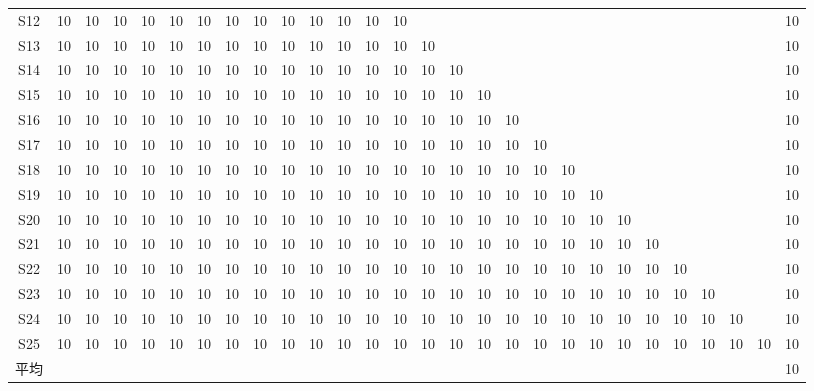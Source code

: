 \begin{landscape}
\begin{table}[t]
\begin{tabular}{c|ccccccccccccccccccccccccccc}
        S12 & 10 & 10 & 10 & 10 & 10 & 10 & 10 & 10 & 10 & 10 & 10 & 10 & 10 &    &    &    &    &    &    &    &    &    &    &    &    &    & 10 \\
        S13 & 10 & 10 & 10 & 10 & 10 & 10 & 10 & 10 & 10 & 10 & 10 & 10 & 10 & 10 &    &    &    &    &    &    &    &    &    &    &    &    & 10 \\
        S14 & 10 & 10 & 10 & 10 & 10 & 10 & 10 & 10 & 10 & 10 & 10 & 10 & 10 & 10 & 10 &    &    &    &    &    &    &    &    &    &    &    & 10 \\
        S15 & 10 & 10 & 10 & 10 & 10 & 10 & 10 & 10 & 10 & 10 & 10 & 10 & 10 & 10 & 10 & 10 &    &    &    &    &    &    &    &    &    &    & 10 \\
        S16 & 10 & 10 & 10 & 10 & 10 & 10 & 10 & 10 & 10 & 10 & 10 & 10 & 10 & 10 & 10 & 10 & 10 &    &    &    &    &    &    &    &    &    & 10 \\
        S17 & 10 & 10 & 10 & 10 & 10 & 10 & 10 & 10 & 10 & 10 & 10 & 10 & 10 & 10 & 10 & 10 & 10 & 10 &    &    &    &    &    &    &    &    & 10 \\
        S18 & 10 & 10 & 10 & 10 & 10 & 10 & 10 & 10 & 10 & 10 & 10 & 10 & 10 & 10 & 10 & 10 & 10 & 10 & 10 &    &    &    &    &    &    &    & 10 \\
        S19 & 10 & 10 & 10 & 10 & 10 & 10 & 10 & 10 & 10 & 10 & 10 & 10 & 10 & 10 & 10 & 10 & 10 & 10 & 10 & 10 &    &    &    &    &    &    & 10 \\
        S20 & 10 & 10 & 10 & 10 & 10 & 10 & 10 & 10 & 10 & 10 & 10 & 10 & 10 & 10 & 10 & 10 & 10 & 10 & 10 & 10 & 10 &    &    &    &    &    & 10 \\
        S21 & 10 & 10 & 10 & 10 & 10 & 10 & 10 & 10 & 10 & 10 & 10 & 10 & 10 & 10 & 10 & 10 & 10 & 10 & 10 & 10 & 10 & 10 &    &    &    &    & 10 \\
        S22 & 10 & 10 & 10 & 10 & 10 & 10 & 10 & 10 & 10 & 10 & 10 & 10 & 10 & 10 & 10 & 10 & 10 & 10 & 10 & 10 & 10 & 10 & 10 &    &    &    & 10 \\
        S23 & 10 & 10 & 10 & 10 & 10 & 10 & 10 & 10 & 10 & 10 & 10 & 10 & 10 & 10 & 10 & 10 & 10 & 10 & 10 & 10 & 10 & 10 & 10 & 10 &    &    & 10 \\
        S24 & 10 & 10 & 10 & 10 & 10 & 10 & 10 & 10 & 10 & 10 & 10 & 10 & 10 & 10 & 10 & 10 & 10 & 10 & 10 & 10 & 10 & 10 & 10 & 10 & 10 &    & 10 \\
        S25 & 10 & 10 & 10 & 10 & 10 & 10 & 10 & 10 & 10 & 10 & 10 & 10 & 10 & 10 & 10 & 10 & 10 & 10 & 10 & 10 & 10 & 10 & 10 & 10 & 10 & 10 & 10\\
        \midrule
        平均&&&&&&&&&&&&&&&&&&&&&&&&&&&10\\
        \bottomrule[0.1em]
    \end{tabular}
    \label{tab:table2}
\end{table}
\end{landscape}